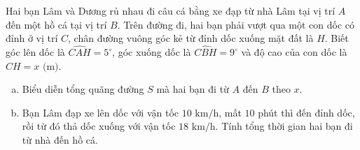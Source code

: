 

\begin{bt}%
Hai bạn Lâm và Dương rủ nhau đi câu cá bằng xe đạp từ nhà Lâm tại vị trí $A$ đến một hồ cá tại vị trí $B$. Trên đường đi, hai bạn phải vượt qua một con dốc có đỉnh ở vị trí $C$, chân đường vuông góc kẻ từ đỉnh dốc xuống mặt đất là $H$. Biết góc lên dốc là $\widehat{CAH} = 5^\circ$, góc xuống dốc là $\widehat{CBH} = 9^\circ$ và độ cao của con dốc là $CH = x\text{ (m)}$.
\begin{enumerate}[a)]
    \item Biểu diễn tổng quãng đường $S$ mà hai bạn đi từ $A$ đến $B$ theo $x$.
    \item Bạn Lâm đạp xe lên dốc với vận tốc $10\text{ km/h}$, mất $10$ phút thì đến đỉnh dốc, rồi từ đó thả dốc xuống với vận tốc $18\text{ km/h}$. Tính tổng thời gian hai bạn đi từ nhà đến hồ cá.
\end{enumerate}
\end{bt}
